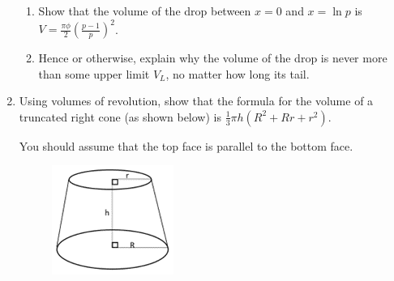 \documentclass[../main.tex]{subfiles}
\begin{document}
\begin{enumerate}[itemsep=0.5cm]
    \begin{enumerate}
        \item Show that the volume of the drop between $x=0$ and $x=\ln{p}$ is $V=\frac{\pi \phi}{2}(\frac{p-1}{p})^2$.

        \item Hence or otherwise, explain why the volume of the drop is never more than some upper limit $V_L$, no matter how long its tail.
    \end{enumerate}
        
    \pagebreak
    \item 
    Using volumes of revolution, show that the formula for the volume of a truncated right cone (as shown below) is $\frac{1}{3}\pi h(R^2 + Rr + r^2)$.

    You should assume that the top face is parallel to the bottom face.

    \begin{figure}[h]
        \centering
        \includegraphics{images/volrev19.png}
    \end{figure}

\end{enumerate}


\pagebreak
\end{document}
